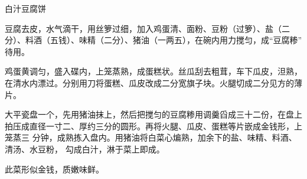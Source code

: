 %
%
%
%
%
%
%
\begin{recipe}[金钱豆腐]{白汁豆腐饼}

\ingredients


\preparation

\step 豆腐去皮，水气滴干，用丝箩过细，加入鸡蛋清、面粉、豆粉（过箩）、盐（二
分）、料酒（五钱）、味精（二分）、猪油（一两五），在碗内用力搅匀，成“豆腐糁”
待用。

\step 鸡蛋黄调匀，盛入碟内，上笼蒸熟，成蛋糕状。丝瓜刮去粗茸，车下瓜皮，泹熟，
在清水内漂过。分别用刀将蛋糕、瓜皮改成二分宽旗子块。火腿切成二分见方的薄片。

\step 大平瓷盘一个，先用猪油抹上，然后把搅匀的豆腐糁用调羹舀成三十二份，在盘上
拍压成直径一寸二、厚约三分的圆形。再将火腿、瓜皮、蛋糕等片嵌成金钱形，上笼蒸三
分钟，成熟拣入盘内。用猪油将白菜心煸熟，加余下的盐、味精、料酒、清汤、水豆粉，
勾成白汁，淋于菜上即成。

\features

此菜形似金钱，质嫩味鲜。

\end{recipe}

